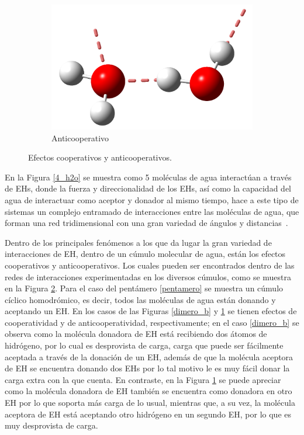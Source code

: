\begin{figure}[b!]
\begin{subfigure}[b]{0.3\linewidth}
\includegraphics[width=\linewidth]{2/img/dimero_c}
\caption{Anticooperativo}
\label{dimero_c}
\end{subfigure}
\caption{Efectos cooperativos y anticooperativos.}
\label{fig:coop}
\end{figure}

En la Figura \ref{4_h2o} se muestra como 5 moléculas de agua interactúan a
través de EHs, donde la fuerza y direccionalidad de los EHs, así como la
capacidad del agua de interactuar como aceptor y donador al mismo tiempo, hace
a este tipo de sistemas un complejo entramado de interacciones entre las
moléculas de agua, que forman una red tridimensional con una gran variedad de
ángulos y distancias~\cite{liu_science, smith2005}.

Dentro de los principales fenómenos a los que da lugar la gran variedad de
interacciones de EH, dentro de un cúmulo molecular de agua, están los efectos
cooperativos y anticooperativos. Los cuales pueden ser encontrados dentro de
las redes de interacciones experimentadas en los diversos cúmulos, como se
muestra en la Figura \ref{fig:coop}. Para el caso del pentámero \ref{pentamero}
se muestra un cúmulo cíclico homodrómico, es decir, todos las moléculas de agua
están donando y aceptando un EH.  En los casos de las Figuras \ref{dimero_b} y
\ref{dimero_c} se tienen efectos de cooperatividad y de anticooperatividad,
respectivamente; en el caso \ref{dimero_b} se observa como la molécula donadora
de EH está recibiendo dos átomos de hidrógeno, por lo cual es desprovista de
carga, carga que puede ser fácilmente aceptada a través de la donación de un
EH, además de que la molécula aceptora de EH se encuentra donando dos EHs por
lo tal motivo le es muy fácil donar la carga extra con la que cuenta. En
contraste, en la Figura \ref{dimero_c} se puede apreciar como la molécula
donadora de EH también se encuentra como donadora en otro EH por lo que soporta
más carga de lo usual, mientras que, a su vez, la molécula aceptora de EH está
aceptando otro hidrógeno en un segundo EH, por lo que es muy desprovista de
carga.

